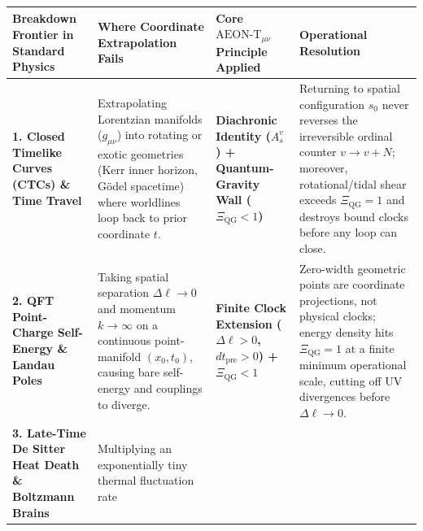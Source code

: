 \documentclass[
]{article}
\newcounter{none} %
\begin{document}
{\def\LTcaptype{none} %
\begin{longtable}[]{@{}
  >{\raggedright\arraybackslash}p{}
  >{\raggedright\arraybackslash}p{}
  >{\raggedright\arraybackslash}p{}
  >{\raggedright\arraybackslash}p{}@{}}
\toprule\noalign{}
\begin{minipage}[b]{\linewidth}\raggedright
Breakdown Frontier in Standard Physics
\end{minipage} & \begin{minipage}[b]{\linewidth}\raggedright
Where Coordinate Extrapolation Fails
\end{minipage} & \begin{minipage}[b]{\linewidth}\raggedright
Core \(\text{AEON-T}_{\mu\nu}\) Principle Applied
\end{minipage} & \begin{minipage}[b]{\linewidth}\raggedright
Operational Resolution
\end{minipage} \\
\midrule\noalign{}
\endhead
\bottomrule\noalign{}
\endlastfoot
\textbf{1. Closed Timelike Curves (CTCs) \& Time Travel} & Extrapolating
Lorentzian manifolds (\(g_{\mu\nu}\)) into rotating or exotic geometries
(Kerr inner horizon, Gödel spacetime) where worldlines loop back to
prior coordinate \(t\). & \textbf{Diachronic Identity (\(A_s^v\)) +
Quantum-Gravity Wall (\(\Xi_{\mathrm{QG}} < 1\))} & Returning to spatial
configuration \(s_0\) never reverses the irreversible ordinal counter
\(v \to v + N\); moreover, rotational/tidal shear exceeds
\(\Xi_{\mathrm{QG}} = 1\) and destroys bound clocks before any loop can
close. \\
\textbf{2. QFT Point-Charge Self-Energy \& Landau Poles} & Taking
spatial separation \(\Delta\ell \to 0\) and momentum \(k \to \infty\) on
a continuous point-manifold \((x_0, t_0)\), causing bare self-energy and
couplings to diverge. & \textbf{Finite Clock Extension
(\(\Delta\ell > 0\), \(dt_{\mathrm{pre}} > 0\)) +
\(\Xi_{\mathrm{QG}} < 1\)} & Zero-width geometric points are coordinate
projections, not physical clocks; energy density hits
\(\Xi_{\mathrm{QG}} = 1\) at a finite minimum operational scale, cutting
off UV divergences before \(\Delta\ell \to 0\). \\
\textbf{3. Late-Time De Sitter Heat Death \& Boltzmann Brains} &
Multiplying an exponentially tiny thermal fluctuation rate

\end{longtable}}
\end{document}
